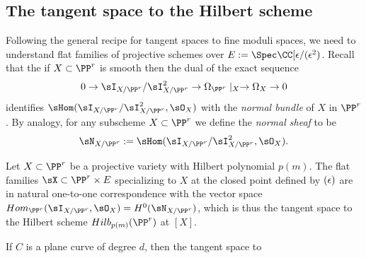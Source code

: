 \subsection{The tangent space to the Hilbert scheme}

Following the general recipe for tangent spaces to fine moduli spaces, we need to understand flat families
of projective schemes over $E := \Spec \CC[\eps/(\eps^2)$. Recall that the if $X\subset \PP^r$ is smooth then
the dual of the exact sequence
$$
0\to \sI_{X/\PP^r}/\sI_{X/\PP^r}^2 \to \Omega_{\PP^r}\mid_X \to \Omega_X \to 0
$$
identifies $\sHom(\sI_{X/\PP^r}/\sI_{X/\PP^r}^2, \sO_X)$ with the \emph{normal bundle} of $X$ in $\PP^r$.
By analogy, for any subscheme $X\subset \PP^r$ we define the \emph{normal sheaf} to be
$$
\sN_{X/\PP^r} := \sHom(\sI_{X/\PP^r}/\sI_{X/\PP^r}^2, \sO_X).
$$

\begin{theorem}
Let $X\subset \PP^r$ be a projective variety with Hilbert polynomial $p(m)$. The flat families 
$\sX \subset \PP^r\times E$ specializing to $X$ at the closed point defined by $(\eps)$
are in natural one-to-one correspondence with the vector space $Hom_{\PP^r}(\sI_{X/\PP^r}, \sO_X) = H^0(\sN_{X/\PP^r})$, which is thus the tangent space to the Hilbert scheme $Hilb_{p(m)}(\PP^r)$ at $[X]$.
\end{theorem}

\begin{example}
If $C$ is a plane curve of degree $d$, then the tangent space to 
\end{example}

